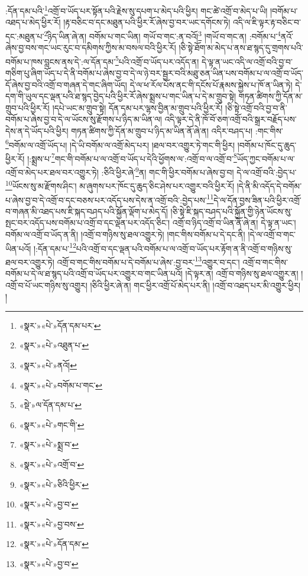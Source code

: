 :དོན་དམ་པའི་\footnote{«སྣར་»«པེ་»དོན་དམ་པར་}འགྲོ་བ་ཡོད་པར་སྟོན་པའི་རྗེས་སུ་དཔག་པ་མེད་པའི་ཕྱིར། གང་ཚེ་འགྲོ་བ་མེད་པ་ཡི། །བགོམ་པ་འཐད་པ་མེད་ཕྱིར་རོ། །རྟ་བཅིང་བ་དང་མཐུན་པའི་ཕྱིར་རོ་ཞེས་བྱ་བར་ཡང་དགོངས་ཏེ། འདི་ལ་ཇི་ལྟར་རྟ་བཅིང་བ་དང་:མཐུན་པ་\footnote{«སྣར་»«པེ་»འཐུན་པ་}ཉིད་ཡིན་ཞེ་ན། བགོམ་པ་གང་ཡིན། གཡོ་བ་གང་:ན་བའོ།\footnote{«སྣར་»«པེ་»ནའོ།} །གཡོ་བ་གང་ན། :བགོམ་པ་\footnote{«སྣར་»«པེ་»བགོམ་པ་གང་}ནའོ་ཞེས་བྱ་བས་གང་ཡང་རུང་བ་དམིགས་ཀྱིས་མ་བསལ་བའི་ཕྱིར་རོ། །ཅི་སྟེ་ཐོག་མ་མེད་པ་ནས་ཐ་སྙད་དུ་གྲགས་པའི་བགོམ་པ་ཁས་བླངས་ནས་དེ་:ལ་དོན་དམ་\footnote{«སྡེ་»ལ་དོན་དམ་པ་}པའི་འགྲོ་བ་ཡོད་པར་འདོད་ན། དེ་ལྟ་ན་ཡང་འདི་ལ་འགྲོ་བའི་བྱ་བ་གཅིག་པུ་ཞིག་ཡོད་པ་དེ་ནི་བགོམ་པ་ཞེས་བྱ་བ་དེ་ལ་ཉེ་བར་སྦྱར་བའི་མཐུ་ཅན་ཡིན་པས་བགོམ་པ་ལ་འགྲོ་བ་ཡོད་དོ་ཞེས་བྱ་བའི་འགྲོ་བ་གཞན་དེ་གང་ཞིག་ཡོད། དེ་ལ་ཕ་རོལ་པོས་ནང་གི་དངོས་པོ་རྣམས་སྐྱེས་པ་ཁོ་ན་ཡིན་ཏེ། དེ་དག་གི་ཡུལ་དང་ལྡན་པའི་ཐ་སྙད་བྱེད་པའི་ཕྱིར་རོ་ཞེས་སྨྲས་པ་གང་ཡིན་པ་དེ་མ་གྲུབ་སྟེ། གཏན་ཚིགས་ཀྱི་དོན་མ་གྲུབ་པའི་ཕྱིར་རོ། །དཔེ་ཡང་མ་གྲུབ་སྟེ། དོན་དམ་པར་ལྷས་བྱིན་མ་གྲུབ་པའི་ཕྱིར་རོ། །ཅི་སྟེ་འགྲོ་བའི་བྱ་བ་ནི་བགོམ་པ་ཞེས་བྱ་བ་དེ་ལ་ཡོངས་སུ་རྫོགས་པ་ཉིད་མ་ཡིན་ལ། འདི་ལྟར་དེ་ནི་ཁོ་བོ་ཅག་འགྲོ་བའི་སྒྲར་བརྗོད་པས་དེས་ན་དེ་ཡོད་པའི་ཕྱིར། གཏན་ཚིགས་ཀྱི་དོན་མ་གྲུབ་པ་ཉིད་མ་ཡིན་ནོ་ཞེ་ན། འདིར་བཤད་པ། :གང་གིས་\footnote{«སྣར་»«པེ་»གང་གི་}བགོམ་ལ་འགྲོ་ཡོད་པ། །དེ་ཡི་བགོམ་ལ་འགྲོ་མེད་པར། །ཐལ་བར་འགྱུར་ཏེ་གང་གི་ཕྱིར། །བགོམ་པ་ཁོང་དུ་ཆུད་ཕྱིར་རོ། །:སྨྲས་པ་\footnote{«སྣར་»«པེ་»སྨྲ་བ་}གང་གི་བགོམ་པ་ལ་འགྲོ་བ་ཡོད་པ་དེའི་ཕྱོགས་ལ་:འགྲོ་བ་ལ་འགྲོ་བ་\footnote{«སྣར་»«པེ་»འགྲོ་བ་}ཡོད་ཀྱང་བགོམ་པ་ལ་འགྲོ་བ་མེད་པར་ཐལ་བར་འགྱུར་ཏེ། :ཅིའི་ཕྱིར་ཞེ་\footnote{«སྣར་»«པེ་»ཅིའི་ཕྱིར་}ན། གང་གི་ཕྱིར་བགོམ་པ་ཞེས་བྱ་བ། དེ་ལ་འགྲོ་བའི་:བྱེད་པ་\footnote{«སྣར་»«པེ་»བྱ་བ་}ཡོངས་སུ་མ་རྫོགས་ཤིང་། མ་ཞུགས་པར་ཁོང་དུ་ཆུད་ཅིང་ཤེས་པར་འགྱུར་བའི་ཕྱིར་རོ། །དེ་ནི་མི་འདོད་དེ་བགོམ་པ་ཞེས་བྱ་བ་དེ་འགྲོ་བ་དང་བཅས་པར་འདོད་པས་དེས་ན་འགྲོ་བའི་:བྱེད་པས་\footnote{«སྣར་»«པེ་»བྱ་བས་}དེ་ལ་དོན་བྱས་ཟིན་པའི་ཕྱིར་འགྲོ་བ་གཞན་མི་འཐད་པས་ཇི་སྐད་བཤད་པའི་སྐྱོན་ལྡོག་པ་མེད་དོ། །ཅི་སྟེ་ཇི་སྐད་བཤད་པའི་སྐྱོན་གྱི་ཉེན་ཡོངས་སུ་སྤང་བར་འདོད་པས་བགོམ་པ་འགྲོ་བ་དང་ལྡན་པར་འདོད་ཅིང་། འགྲོ་བ་ཉིད་འགྲོ་བ་ཡིན་ནོ་ཞེ་ན། དེ་ལྟ་ན་ཡང་། བགོམ་ལ་འགྲོ་བ་ཡོད་ན་ནི། །འགྲོ་བ་གཉིས་སུ་ཐལ་འགྱུར་ཏེ། །གང་གིས་བགོམ་པ་དེ་དང་ནི། །དེ་ལ་འགྲོ་བ་གང་ཡིན་པའོ། །:དོན་དམ་པ་\footnote{«སྣར་»«པེ་»དོན་དམ་}པའི་འགྲོ་བ་དང་ལྡན་པའི་བགོམ་པ་ལ་འགྲོ་བ་ཡོད་པར་རྟོག་ན་ནི་འགྲོ་བ་གཉིས་སུ་ཐལ་བར་འགྱུར་ཏེ། འགྲོ་བ་གང་གིས་བགོམ་པ་དེ་བགོམ་པ་ཞེས་:བྱ་བར་\footnote{«སྣར་»«པེ་»བྱ་བ་}འགྱུར་བ་དང་། འགྲོ་བ་གང་གིས་བགོམ་པ་དེ་ལ་ཐ་སྙད་པའི་འགྲོ་བ་ཡོད་པར་འགྱུར་བ་གང་ཡིན་པའོ། །དེ་ལྟར་ན། འགྲོ་བ་གཉིས་སུ་ཐལ་འགྱུར་ན། །འགྲོ་བ་པོ་ཡང་གཉིས་སུ་འགྱུར། །ཅིའི་ཕྱིར་ཞེ་ན། གང་ཕྱིར་འགྲོ་པོ་མེད་པར་ནི། །འགྲོ་བ་འཐད་པར་མི་འགྱུར་ཕྱིར། །
